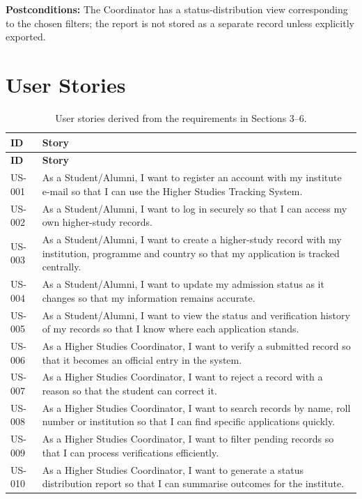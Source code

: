 \documentclass[11pt,a4paper]{article}
\begin{document}
\medskip

\noindent\textbf{Postconditions:} The Coordinator has a status-distribution view corresponding to the chosen filters; the report is not stored as a separate record unless explicitly exported.

\section{User Stories}
\begin{longtable}{@{}p{1.4cm} p{14.5cm}@{}}
\caption{User stories derived from the requirements in Sections 3--6.}
\label{tab:us}
\toprule
\textbf{ID} & \textbf{Story} \\
\midrule
\endfirsthead
\toprule
\textbf{ID} & \textbf{Story} \\
\midrule
\endhead
US-001 & As a Student/Alumni, I want to register an account with my institute e-mail so that I can use the Higher Studies Tracking System. \\
US-002 & As a Student/Alumni, I want to log in securely so that I can access my own higher-study records. \\
US-003 & As a Student/Alumni, I want to create a higher-study record with my institution, programme and country so that my application is tracked centrally. \\
US-004 & As a Student/Alumni, I want to update my admission status as it changes so that my information remains accurate. \\
US-005 & As a Student/Alumni, I want to view the status and verification history of my records so that I know where each application stands. \\
US-006 & As a Higher Studies Coordinator, I want to verify a submitted record so that it becomes an official entry in the system. \\
US-007 & As a Higher Studies Coordinator, I want to reject a record with a reason so that the student can correct it. \\
US-008 & As a Higher Studies Coordinator, I want to search records by name, roll number or institution so that I can find specific applications quickly. \\
US-009 & As a Higher Studies Coordinator, I want to filter pending records so that I can process verifications efficiently. \\
US-010 & As a Higher Studies Coordinator, I want to generate a status distribution report so that I can summarise outcomes for the institute. \\

\end{longtable}
\end{document}

